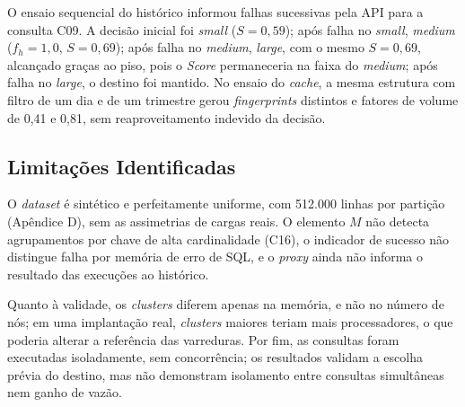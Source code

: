 O ensaio sequencial do histórico informou falhas sucessivas pela API para a consulta C09. A decisão inicial foi \textit{small} ($S = 0,59$); após falha no \textit{small}, \textit{medium} ($f_h = 1,0$, $S = 0,69$); após falha no \textit{medium}, \textit{large}, com o mesmo $S = 0,69$, alcançado graças ao piso, pois o \textit{Score} permaneceria na faixa do \textit{medium}; após falha no \textit{large}, o destino foi mantido. No ensaio do \textit{cache}, a mesma estrutura com filtro de um dia e de um trimestre gerou \textit{fingerprints} distintos e fatores de volume de 0,41 e 0,81, sem reaproveitamento indevido da decisão.

\subsection{Limitações Identificadas}

O \textit{dataset} é sintético e perfeitamente uniforme, com 512.000 linhas por partição (Apêndice D), sem as assimetrias de cargas reais. O elemento $M$ não detecta agrupamentos por chave de alta cardinalidade (C16), o indicador de sucesso não distingue falha por memória de erro de SQL, e o \textit{proxy} ainda não informa o resultado das execuções ao histórico.

Quanto à validade, os \textit{clusters} diferem apenas na memória, e não no número de nós; em uma implantação real, \textit{clusters} maiores teriam mais processadores, o que poderia alterar a referência das varreduras. Por fim, as consultas foram executadas isoladamente, sem concorrência; os resultados validam a escolha prévia do destino, mas não demonstram isolamento entre consultas simultâneas nem ganho de vazão.
